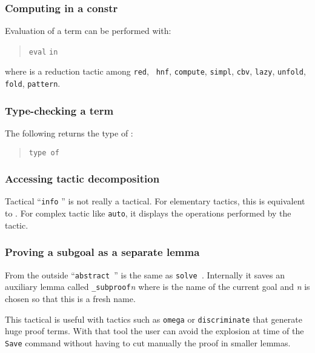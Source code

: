 \subsubsection[Computing in a constr]{Computing in a constr
}

Evaluation of a term can be performed with:
\begin{quote}
{\tt eval} {} {\tt in} {\term}
\end{quote}
where  is a reduction tactic among {\tt red}, {\tt
hnf}, {\tt compute}, {\tt simpl}, {\tt cbv}, {\tt lazy}, {\tt unfold},
{\tt fold}, {\tt pattern}.

\subsubsection{Type-checking a term}

The following returns the type of {\term}:

\begin{quote}
{\tt type of} {\term}
\end{quote}

\subsubsection[Accessing tactic decomposition]{Accessing tactic decomposition
}

Tactical ``{\tt info} {\tacexpr}'' is not really a tactical. For
elementary tactics, this is equivalent to \tacexpr. For complex tactic
like \texttt{auto}, it displays the operations performed by the
tactic.

\subsubsection[Proving a subgoal as a separate lemma]{Proving a subgoal as a separate lemma
}

From the outside ``\texttt{abstract \tacexpr}'' is the same as
{\tt solve \tacexpr}. Internally it saves an auxiliary lemma called 
{\ident}\texttt{\_subproof}\textit{n} where {\ident} is the name of the
current goal and \textit{n} is chosen so that this is a fresh name.

This tactical is useful with tactics such as \texttt{omega} or
\texttt{discriminate} that generate huge proof terms. With that tool
the user can avoid the explosion at time of the \texttt{Save} command
without having to cut manually the proof in smaller lemmas.

